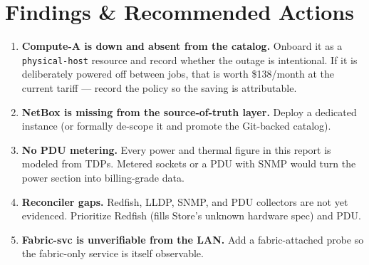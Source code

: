 \documentclass[11pt]{article}
\begin{document}
\section{Findings \& Recommended Actions}
\begin{enumerate}[leftmargin=1.6em]
\item \textbf{Compute-A is down and absent from the catalog.} Onboard it as a
  \texttt{physical-host} resource and record whether the outage is intentional.
  If it is deliberately powered off between jobs, that is worth
  \$138/month at the current tariff --- record the
  policy so the saving is attributable.
\item \textbf{NetBox is missing from the source-of-truth layer.} Deploy a
  dedicated instance (or formally de-scope it and promote the Git-backed
  catalog).
\item \textbf{No PDU metering.} Every power and thermal figure in this report
  is modeled from TDPs. Metered sockets or a PDU with SNMP would turn the
  power section into billing-grade data.
\item \textbf{Reconciler gaps.} Redfish, LLDP, SNMP, and PDU collectors are
  not yet evidenced. Prioritize Redfish (fills Store's unknown hardware spec)
  and PDU.
\item \textbf{Fabric-svc is unverifiable from the LAN.} Add a fabric-attached
  probe so the fabric-only service is itself observable.
\end{enumerate}
\end{document}

